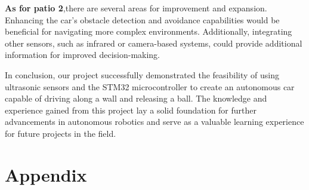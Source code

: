 \documentclass[12pt, a4paper, oneside]{report}
\begin{document}
\textbf{As for patio 2},there are several areas for improvement and expansion. Enhancing the car's obstacle detection and avoidance capabilities would be beneficial for navigating more complex environments. Additionally, integrating other sensors, such as infrared or camera-based systems, could provide additional information for improved decision-making.

In conclusion, our project successfully demonstrated the feasibility of using ultrasonic sensors and the STM32 microcontroller to create an autonomous car capable of driving along a wall and releasing a ball. The knowledge and experience gained from this project lay a solid foundation for further advancements in autonomous robotics and serve as a valuable learning experience for future projects in the field.
\newpage

\newpage




\newpage
\chapter{Appendix}
	
\end{document}
